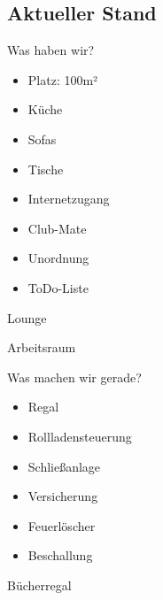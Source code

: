 \documentclass[hyperref={pdfpagelabels=false}]{beamer}
\begin{document}
\subsection{Aktueller Stand}

\begin{frame}{Was haben wir?}
    \begin{itemize}
        \item Platz: 100m²
        \pause
        \item Küche
        \item Sofas
        \item Tische
        \pause
        \item Internetzugang
        \item Club-Mate
        \pause
        \item Unordnung
        \item ToDo-Liste
    \end{itemize}
\end{frame}

\begin{frame}{Lounge}
    \begin{figure}
    \end{figure}
\end{frame}

\begin{frame}{Arbeitsraum}
    \begin{figure}
    \end{figure}
\end{frame}

\begin{frame}{Was machen wir gerade?}
    \begin{itemize}
        \item Regal
        \pause
        \item Rollladensteuerung
        \pause
        \item Schließanlage
        \pause
        \item Versicherung
        \item Feuerlöscher
        \item Beschallung
    \end{itemize}
\end{frame}

\begin{frame}{Bücherregal}
    \begin{figure}
    \end{figure}
\end{frame}
\end{document}
